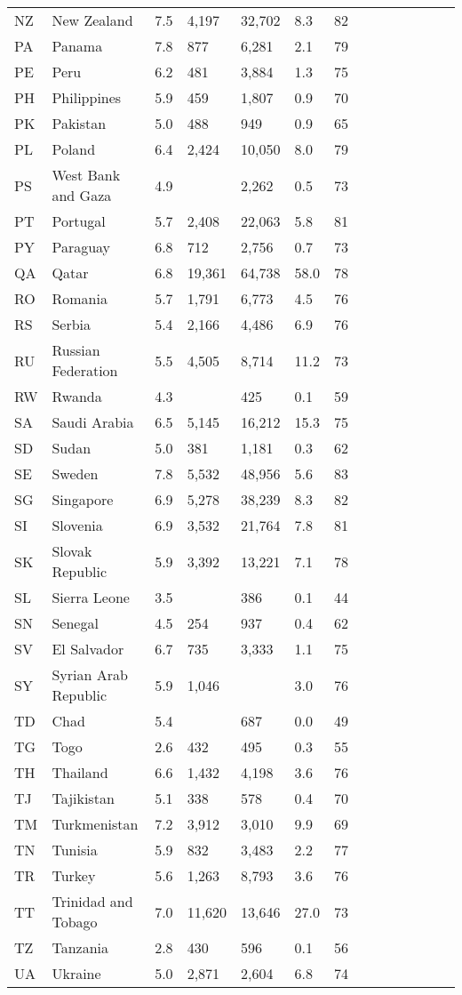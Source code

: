 \begin{scriptsize}
\begin{center}
\begin{longtable}{llllllllllllll}
NZ&New Zealand&7.5&4,197&32,702&8.3&82\\
PA&Panama&7.8&877&6,281&2.1&79\\
PE&Peru&6.2&481&3,884&1.3&75\\
PH&Philippines&5.9&459&1,807&0.9&70\\
PK&Pakistan&5.0&488&949&0.9&65\\
PL&Poland&6.4&2,424&10,050&8.0&79\\
PS&West Bank and Gaza&4.9&&2,262&0.5&73\\
PT&Portugal&5.7&2,408&22,063&5.8&81\\
PY&Paraguay&6.8&712&2,756&0.7&73\\
QA&Qatar&6.8&19,361&64,738&58.0&78\\
RO&Romania&5.7&1,791&6,773&4.5&76\\
RS&Serbia&5.4&2,166&4,486&6.9&76\\
RU&Russian Federation&5.5&4,505&8,714&11.2&73\\
RW&Rwanda&4.3&&425&0.1&59\\
SA&Saudi Arabia&6.5&5,145&16,212&15.3&75\\
SD&Sudan&5.0&381&1,181&0.3&62\\
SE&Sweden&7.8&5,532&48,956&5.6&83\\
SG&Singapore&6.9&5,278&38,239&8.3&82\\
SI&Slovenia&6.9&3,532&21,764&7.8&81\\
SK&Slovak Republic&5.9&3,392&13,221&7.1&78\\
SL&Sierra Leone&3.5&&386&0.1&44\\
SN&Senegal&4.5&254&937&0.4&62\\
SV&El Salvador&6.7&735&3,333&1.1&75\\
SY&Syrian Arab Republic&5.9&1,046&&3.0&76\\
TD&Chad&5.4&&687&0.0&49\\
TG&Togo&2.6&432&495&0.3&55\\
TH&Thailand&6.6&1,432&4,198&3.6&76\\
TJ&Tajikistan&5.1&338&578&0.4&70\\
TM&Turkmenistan&7.2&3,912&3,010&9.9&69\\
TN&Tunisia&5.9&832&3,483&2.2&77\\
TR&Turkey&5.6&1,263&8,793&3.6&76\\
TT&Trinidad and Tobago&7.0&11,620&13,646&27.0&73\\
TZ&Tanzania&2.8&430&596&0.1&56\\
UA&Ukraine&5.0&2,871&2,604&6.8&74\\

\end{longtable}
\end{center}
\end{scriptsize}
